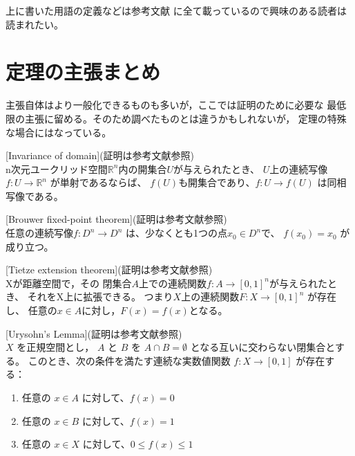 \documentclass[uplatex]{jsarticle}
\begin{document}
上に書いた用語の定義などは参考文献\cite{kawazumi}
に全て載っているので興味のある読者は読まれたい。




\section{定理の主張まとめ}\label{Fact}
主張自体はより一般化できるものも多いが，ここでは証明のために必要な
最低限の主張に留める。そのため調べたものとは違うかもしれないが，
定理の特殊な場合にはなっている。

\begin{fact}\label{Fact:Invariance of domain}[Invariance of domain](証明は参考文献\cite{tao}参照)\\
    n次元ユークリッド空間$\mathbb{R}^n$内の開集合$U$が与えられたとき、
    $U$上の連続写像$f: U \rightarrow \mathbb{R}^n$ が単射であるならば、
    $f(U)$も開集合であり、$f: U \rightarrow f(U)$ は同相写像である。
\end{fact}

\begin{fact}\label{Fact:Brouwer fixed-point theorem}[Brouwer fixed-point theorem](証明は参考文献\cite{kawazumi}参照)\\
    任意の連続写像$f: D^n \rightarrow D^n$
    は、少なくとも1つの点$x_0 \in D^n$で、
    $f(x_0) = x_0$ が成り立つ。
\end{fact}


\begin{fact}\label{Fact:Tietze extension theorem}[Tietze extension theorem](証明は参考文献\cite{kawazumi}参照)\\
    Xが距離空間で，その
    閉集合$A$上での連続関数$f: A \rightarrow [0, 1]^n$が与えられたとき、
    それをX上に拡張できる。
    つまり$X$上の連続関数$F: X \rightarrow [0, 1]^n$ が存在し、
    任意の\(x\in Aに対し，F(x) = f(x)\)となる。
\end{fact}




\begin{fact}\label{Fact:Urysohn's Lemma}[Urysohn's Lemma](証明は参考文献\cite{kawazumi}参照)\\
    \(X\) を正規空間とし，
    \(A\) と \(B\) を \(A \cap B = \emptyset\) となる互いに交わらない閉集合とする。
    このとき、次の条件を満たす連続な実数値関数 \(f: X \to [0, 1]\)
    が存在する：
    \begin{enumerate}
        \item 任意の \(x \in A\) に対して、\(f(x) = 0\)
        \item 任意の \(x \in B\) に対して、\(f(x) = 1\)
        \item 任意の \(x \in X\) に対して、\(0 \leq f(x) \leq 1\)
    \end{enumerate}
\end{fact}
\end{document}

